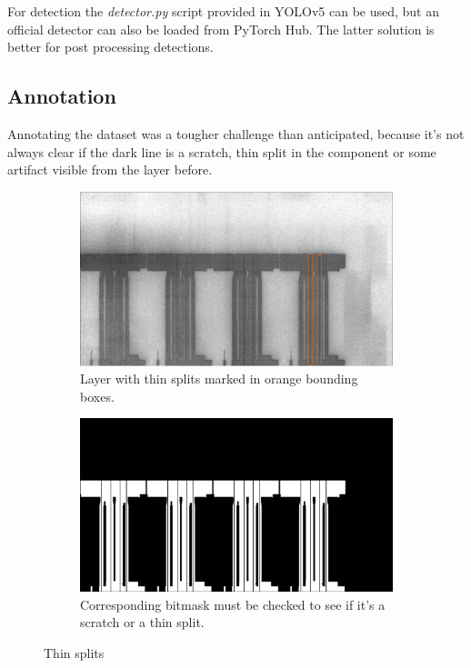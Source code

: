 For detection the \textit{detector.py} script provided in YOLOv5 can be used, but an official detector can also be loaded from PyTorch Hub. The latter solution is better for post processing detections.

\subsection{Annotation}
Annotating the dataset was a tougher challenge than anticipated, because it's not always clear if the dark line is a scratch, thin split in the component or some artifact visible from the layer before. \\

\begin{figure}[ht]
  \centering

  \begin{subfigure}{\textwidth}
    \includegraphics[width=\textwidth]{images/layer_01486_marked}
    \caption{Layer with thin splits marked in orange bounding boxes.}

  \end{subfigure}

  \begin{subfigure}{\textwidth}
    \includegraphics[width=\textwidth]{images/bitmask_01486}
    \caption{Corresponding bitmask must be checked to see if it's a scratch or a thin split.}
  \end{subfigure}

  \caption{Thin splits}
  \label{fig:layer_01486}

\end{figure}


